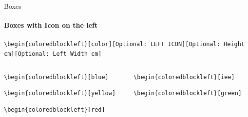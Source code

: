 \documentclass[aspectratio=169]{beamer}
\begin{document}
\begin{frame}{Boxes}
    \framesubtitle{Boxes with Icon on the left}

    \begin{coloredblock}[grey]
        \footnotesize\centering\texttt{\textbackslash begin\{coloredblockleft\}[color][Optional:~LEFT ICON][Optional:~Height cm][Optional:~Left Width cm]}
    \end{coloredblock}

    \vspace{-2.1cm}
    \begin{columns}
        \begin{column}{0.49\textwidth}

            \begin{coloredblockleft}
                \vspace{0.3cm}
                \footnotesize\texttt{\textbackslash begin\{coloredblockleft\}[blue]}\strut
            \end{coloredblockleft}
    
            \begin{coloredblockleft}
                \vspace{0.3cm}
                \footnotesize\texttt{\textbackslash begin\{coloredblockleft\}[yellow]}\strut
            \end{coloredblockleft}
    
            \begin{coloredblockleft}
                \vspace{0.3cm}
                \footnotesize\texttt{\textbackslash begin\{coloredblockleft\}[red]}\strut
            \end{coloredblockleft}

        \end{column}
        \begin{column}{0.49\textwidth}
        
            \begin{coloredblockleft}
                \vspace{0.3cm}
                \footnotesize\texttt{\textbackslash begin\{coloredblockleft\}[iee]}\strut
            \end{coloredblockleft}
    
            \begin{coloredblockleft}
                \vspace{0.3cm}
                \footnotesize\texttt{\textbackslash begin\{coloredblockleft\}[green]}\strut
            \end{coloredblockleft}
    

\end{column}
\end{columns}
\end{frame}
\end{document}
